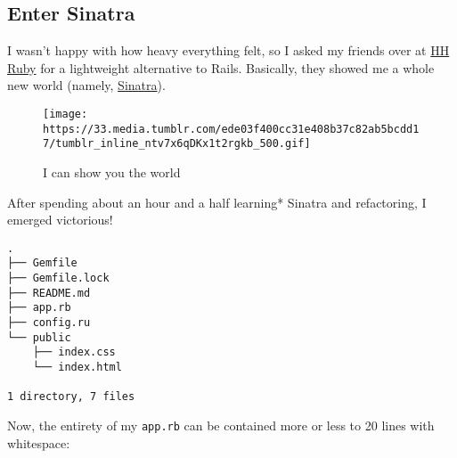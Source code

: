 \subsection{Enter Sinatra}\label{enter-sinatra}

I wasn't happy with how heavy everything felt, so I asked my friends
over at \href{https://www.facebook.com/groups/HHRuby/}{HH Ruby} for a
lightweight alternative to Rails. Basically, they showed me a whole new
world (namely, \href{http://www.sinatrarb.com/}{Sinatra}).

\begin{figure}[htbp]
\centering
\texttt{[image: https://33.media.tumblr.com/ede03f400cc31e408b37c82ab5bcdd17/tumblr\_inline\_ntv7x6qDKx1t2rgkb\_500.gif]}
\caption{I can show you the world}
\end{figure}

After spending about an hour and a half learning* Sinatra and
refactoring, I emerged victorious!

\begin{verbatim}
.
├── Gemfile
├── Gemfile.lock
├── README.md
├── app.rb
├── config.ru
└── public
    ├── index.css
    └── index.html

1 directory, 7 files
\end{verbatim}

Now, the entirety of my \texttt{app.rb} can be contained more or less to
20 lines with whitespace:

\begin{Shaded}
\begin{Highlighting}[]

 
    \NormalTok{)}


 
     \NormalTok{=> }

    \NormalTok{username = params[}\NormalTok{].chomp(}\NormalTok{) }


     
\end{Highlighting}
\end{Shaded}

